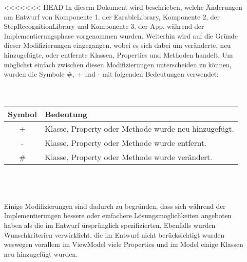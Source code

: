 \documentclass[../implementierung.tex]{subfiles}
\begin{document}
<<<<<<< HEAD
	In diesem Dokument wird beschrieben, welche Änderungen am Entwurf von Komponente 1, der EarableLibrary, Komponente 2, der StepRecognitionLibrary und Komponente 3, der App, während der Implementierungsphase vorgenommen wurden. Weiterhin wird auf die Gründe dieser Modifizierungen eingegangen, wobei es sich dabei um veränderte, neu hinzugefügte, oder entfernte Klassen, Properties und Methoden handelt. Um möglichst einfach zwischen diesen Modifizierungen unterscheiden zu können, wurden die Symbole \#, + und - mit folgenden Bedeutungen verwendet:
	\\
	\\
	\\
	\begin{tabular}[h]{|c|l|}
	\hline 
	Symbol & Bedeutung \\
	\hline 
	+ & Klasse, Property oder Methode wurde neu hinzugefügt. \\
	\hline 
	- & Klasse, Property oder Methode wurde entfernt. \\
	\hline 
	\# & Klasse, Property oder Methode wurde verändert. \\
	\hline 
	\end{tabular}
	\\
	\\
	\\
	Einige Modifizierungen sind dadurch zu begründen, dass sich während der Implementierungen bessere oder einfachere Lösungsmöglichkeiten angeboten haben als die im Entwurf ürsprünglich spezifizierten. Ebenfalls wurden Wunschkriterien verwirklicht, die im Entwurf nicht berücksichtigt wurden weswegen vorallem im ViewModel viele Properties und im Model einige Klassen neu hinzugefügt wurden.
\end{document}
